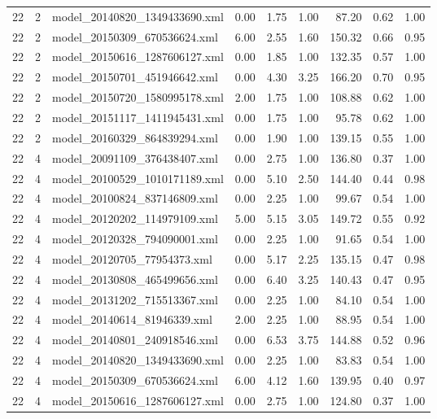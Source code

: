 \begin{table}[ht]
\begin{tabular}{rrlrrrrrr}
   22 &   2 & model\_20140820\_1349433690.xml & 0.00 & 1.75 & 1.00 & 87.20 & 0.62 & 1.00 \\ 
   22 &   2 & model\_20150309\_670536624.xml & 6.00 & 2.55 & 1.60 & 150.32 & 0.66 & 0.95 \\ 
   22 &   2 & model\_20150616\_1287606127.xml & 0.00 & 1.85 & 1.00 & 132.35 & 0.57 & 1.00 \\ 
   22 &   2 & model\_20150701\_451946642.xml & 0.00 & 4.30 & 3.25 & 166.20 & 0.70 & 0.95 \\ 
   22 &   2 & model\_20150720\_1580995178.xml & 2.00 & 1.75 & 1.00 & 108.88 & 0.62 & 1.00 \\ 
   22 &   2 & model\_20151117\_1411945431.xml & 0.00 & 1.75 & 1.00 & 95.78 & 0.62 & 1.00 \\ 
   22 &   2 & model\_20160329\_864839294.xml & 0.00 & 1.90 & 1.00 & 139.15 & 0.55 & 1.00 \\ 
   22 &   4 & model\_20091109\_376438407.xml & 0.00 & 2.75 & 1.00 & 136.80 & 0.37 & 1.00 \\ 
   22 &   4 & model\_20100529\_1010171189.xml & 0.00 & 5.10 & 2.50 & 144.40 & 0.44 & 0.98 \\ 
   22 &   4 & model\_20100824\_837146809.xml & 0.00 & 2.25 & 1.00 & 99.67 & 0.54 & 1.00 \\ 
   22 &   4 & model\_20120202\_114979109.xml & 5.00 & 5.15 & 3.05 & 149.72 & 0.55 & 0.92 \\ 
   22 &   4 & model\_20120328\_794090001.xml & 0.00 & 2.25 & 1.00 & 91.65 & 0.54 & 1.00 \\ 
   22 &   4 & model\_20120705\_77954373.xml & 0.00 & 5.17 & 2.25 & 135.15 & 0.47 & 0.98 \\ 
   22 &   4 & model\_20130808\_465499656.xml & 0.00 & 6.40 & 3.25 & 140.43 & 0.47 & 0.95 \\ 
   22 &   4 & model\_20131202\_715513367.xml & 0.00 & 2.25 & 1.00 & 84.10 & 0.54 & 1.00 \\ 
   22 &   4 & model\_20140614\_81946339.xml & 2.00 & 2.25 & 1.00 & 88.95 & 0.54 & 1.00 \\ 
   22 &   4 & model\_20140801\_240918546.xml & 0.00 & 6.53 & 3.75 & 144.88 & 0.52 & 0.96 \\ 
   22 &   4 & model\_20140820\_1349433690.xml & 0.00 & 2.25 & 1.00 & 83.83 & 0.54 & 1.00 \\ 
   22 &   4 & model\_20150309\_670536624.xml & 6.00 & 4.12 & 1.60 & 139.95 & 0.40 & 0.97 \\ 
   22 &   4 & model\_20150616\_1287606127.xml & 0.00 & 2.75 & 1.00 & 124.80 & 0.37 & 1.00 \\ 

\end{tabular}
\end{table}
